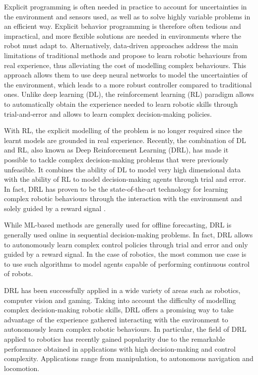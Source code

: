 Explicit programming is often needed in practice to account for uncertainties in the environment and
sensors used, as well as to solve highly variable problems in an efficient way.
Explicit behavior programming is therefore often tedious and impractical, and more flexible solutions
are needed in environments where the robot must adapt to.
Alternatively, data-driven approaches address the main limitations of traditional methods and propose
to learn robotic behaviours from real experience, thus alleviating the cost of modelling complex behaviours.
This approach allows them to use deep neural networks to model the uncertainties of the environment,
which leads to a more robust controller compared to traditional ones.
Unlike deep learning (DL), the reinforcement learning (RL) paradigm allows to automatically obtain the
experience needed to learn robotic skills through trial-and-error and allows to learn complex decision-making
policies.

With RL, the explicit modelling of the problem is no longer required since the learnt models are grounded
in real experience. Recently, the combination of DL and RL, also known as Deep Reinforcement Learning (DRL),
has made it possible to tackle complex decision-making problems that were previously unfeasible. It combines
the ability of DL to model very high dimensional data with the ability of RL to model decision-making agents
through trial and error.
In fact, DRL has proven to be the state-of-the-art technology for learning complex
robotic behaviours through the interaction with the environment and solely guided
by a reward signal \cite{liu2021deep}.

While ML-based methods are generally used for offline forecasting, DRL is generally used online in
sequential decision-making problems. In fact, DRL allows to autonomously learn complex control policies
through trial and error and only guided by a reward signal. In the case of robotics, the most common
use case is to use such algorithms to model agents capable of performing continuous control of robots.

DRL has been successfully applied in a wide variety of areas such as robotics, computer vision and gaming.
Taking into account the difficulty of modelling complex decision-making robotic skills, DRL offers
a promising way to take advantage of the experience gathered interacting with the environment to
autonomously learn complex robotic behaviours. In particular, the field of DRL applied to robotics has
recently gained popularity due to the remarkable performance obtained in applications with high decision-making
and control complexity. Applications range from manipulation, to autonomous navigation and locomotion.
\cite{iriondo2023learning}

